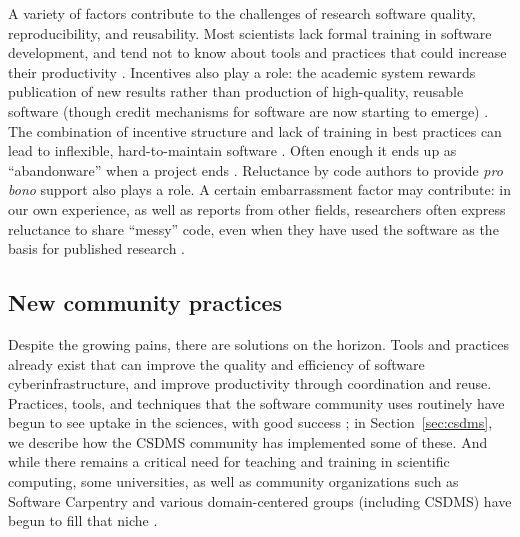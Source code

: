 \documentclass[journal abbreviation, manuscript]{copernicus}
\begin{document}
A variety of factors contribute to the challenges of research software quality, reproducibility, and reusability. Most scientists lack formal training in software development, and tend not to know about tools and practices that could increase their productivity \citep{kelly2007software,basili2008understanding,faulk2009scientific,hannay2009scientists,hwang2017software,alnoamany2018towards,pinto2018scientists,kellogg2018role}.  Incentives also play a role: the academic system rewards publication of new results rather than production of high-quality, reusable software (though credit mechanisms for software are now starting to emerge) \citep{leveque2009python,howison2011scientific,morin2012shining,turk2013scaling,ahalt2014water,poisot2015best,hwang2017software,wiese2019naming}. The combination of incentive structure and lack of training in best practices can lead to inflexible, hard-to-maintain software \citep{brown2014run,johanson2018software}. Often enough it ends up as ``abandonware'' when a project ends \citep{barnes2010publish}. Reluctance by code authors to provide \textit{pro bono} support also plays a role. A certain embarrassment factor may contribute: in our own experience, as well as reports from other fields, researchers often express reluctance to share ``messy'' code, even when they have used the software as the basis for published research \citep{barnes2010publish,morin2012shining,leveque2013top}.



\subsection{New community practices}

Despite the growing pains, there are solutions on the horizon. Tools and practices already exist that can improve the quality and efficiency of software cyberinfrastructure, and improve productivity through coordination and reuse. Practices, tools, and techniques that the software community uses routinely have begun to see uptake in the sciences, with good success \citep{bangerth2013makes,turk2013scaling,hastings2014ten,wilson2014best,brown2014run,poisot2015best,hwang2017software,nanthaamornphong2017test,scott2017esip,taschuk2017ten,wilson2017good,benureau2018re,bryan2018excuse,adorf2018professionally,lathrop2019introduction}; in Section~\ref{sec:csdms}, we describe how the CSDMS community has implemented some of these. And while there remains a critical need for teaching and training in scientific computing, some universities, as well as community organizations such as Software Carpentry and various domain-centered groups (including CSDMS) have begun to fill that niche \citep[e.g.,][]{jacobs2016experiences}. 
\end{document}
